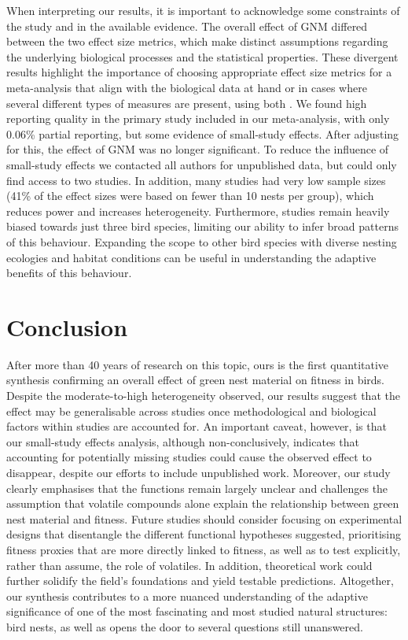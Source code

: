 \documentclass[
  number,
  review,
  onecolumn]{elsarticle}
\begin{document}
When interpreting our results, it is important to acknowledge some
constraints of the study and in the available evidence. The overall
effect of GNM differed between the two effect size metrics, which make
distinct assumptions regarding the underlying biological processes and
the statistical properties. These divergent results highlight the
importance of choosing appropriate effect size metrics for a
meta-analysis that align with the biological data at hand or in cases
where several different types of measures are present, using both
\citep{yang2024}. We found high reporting quality in the primary study
included in our meta-analysis, with only 0.06\% partial reporting, but
some evidence of small-study effects. After adjusting for this, the
effect of GNM was no longer significant. To reduce the influence of
small-study effects we contacted all authors for unpublished data, but
could only find access to two studies. In addition, many studies had
very low sample sizes (41\% of the effect sizes were based on fewer than
10 nests per group), which reduces power and increases heterogeneity.
Furthermore, studies remain heavily biased towards just three bird
species, limiting our ability to infer broad patterns of this behaviour.
Expanding the scope to other bird species with diverse nesting ecologies
and habitat conditions can be useful in understanding the adaptive
benefits of this behaviour.

\section{Conclusion}\label{conclusion}

After more than 40 years of research on this topic, ours is the first
quantitative synthesis confirming an overall effect of green nest
material on fitness in birds. Despite the moderate-to-high heterogeneity
observed, our results suggest that the effect may be generalisable
across studies once methodological and biological factors within studies
are accounted for. An important caveat, however, is that our small-study
effects analysis, although non-conclusively, indicates that accounting
for potentially missing studies could cause the observed effect to
disappear, despite our efforts to include unpublished work. Moreover,
our study clearly emphasises that the functions remain largely unclear
and challenges the assumption that volatile compounds alone explain the
relationship between green nest material and fitness. Future studies
should consider focusing on experimental designs that disentangle the
different functional hypotheses suggested, prioritising fitness proxies
that are more directly linked to fitness, as well as to test explicitly,
rather than assume, the role of volatiles. In addition, theoretical work
could further solidify the field's foundations and yield testable
predictions. Altogether, our synthesis contributes to a more nuanced
understanding of the adaptive significance of one of the most
fascinating and most studied natural structures: bird nests, as well as
opens the door to several questions still unanswered.
\end{document}
